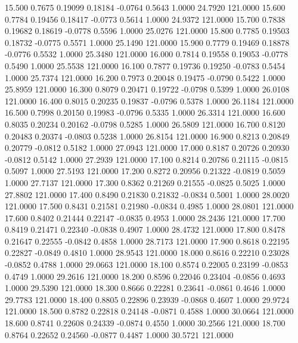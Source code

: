  15.500   0.7675   0.19099   0.18184  -0.0764   0.5643   1.0000  24.7920 121.0000
  15.600   0.7784   0.19456   0.18417  -0.0773   0.5614   1.0000  24.9372 121.0000
  15.700   0.7838   0.19682   0.18619  -0.0778   0.5596   1.0000  25.0276 121.0000
  15.800   0.7785   0.19503   0.18732  -0.0775   0.5571   1.0000  25.1490 121.0000
  15.900   0.7779   0.19469   0.18878  -0.0776   0.5532   1.0000  25.3480 121.0000
  16.000   0.7814   0.19558   0.19053  -0.0778   0.5490   1.0000  25.5538 121.0000
  16.100   0.7877   0.19736   0.19250  -0.0783   0.5454   1.0000  25.7374 121.0000
  16.200   0.7973   0.20048   0.19475  -0.0790   0.5422   1.0000  25.8959 121.0000
  16.300   0.8079   0.20471   0.19722  -0.0798   0.5399   1.0000  26.0108 121.0000
  16.400   0.8015   0.20235   0.19837  -0.0796   0.5378   1.0000  26.1184 121.0000
  16.500   0.7998   0.20150   0.19983  -0.0796   0.5335   1.0000  26.3314 121.0000
  16.600   0.8035   0.20234   0.20162  -0.0798   0.5285   1.0000  26.5809 121.0000
  16.700   0.8120   0.20483   0.20374  -0.0803   0.5238   1.0000  26.8154 121.0000
  16.900   0.8213   0.20849   0.20779  -0.0812   0.5182   1.0000  27.0943 121.0000
  17.000   0.8187   0.20726   0.20930  -0.0812   0.5142   1.0000  27.2939 121.0000
  17.100   0.8214   0.20786   0.21115  -0.0815   0.5097   1.0000  27.5193 121.0000
  17.200   0.8272   0.20956   0.21322  -0.0819   0.5059   1.0000  27.7137 121.0000
  17.300   0.8362   0.21269   0.21555  -0.0825   0.5025   1.0000  27.8802 121.0000
  17.400   0.8490   0.21830   0.21832  -0.0834   0.5001   1.0000  28.0020 121.0000
  17.500   0.8431   0.21581   0.21980  -0.0834   0.4985   1.0000  28.0801 121.0000
  17.600   0.8402   0.21444   0.22147  -0.0835   0.4953   1.0000  28.2436 121.0000
  17.700   0.8419   0.21471   0.22340  -0.0838   0.4907   1.0000  28.4732 121.0000
  17.800   0.8478   0.21647   0.22555  -0.0842   0.4858   1.0000  28.7173 121.0000
  17.900   0.8618   0.22195   0.22827  -0.0849   0.4810   1.0000  28.9543 121.0000
  18.000   0.8616   0.22210   0.23028  -0.0852   0.4788   1.0000  29.0663 121.0000
  18.100   0.8574   0.22005   0.23199  -0.0853   0.4749   1.0000  29.2616 121.0000
  18.200   0.8596   0.22046   0.23404  -0.0856   0.4693   1.0000  29.5390 121.0000
  18.300   0.8666   0.22281   0.23641  -0.0861   0.4646   1.0000  29.7783 121.0000
  18.400   0.8805   0.22896   0.23939  -0.0868   0.4607   1.0000  29.9724 121.0000
  18.500   0.8782   0.22818   0.24148  -0.0871   0.4588   1.0000  30.0664 121.0000
  18.600   0.8741   0.22608   0.24339  -0.0874   0.4550   1.0000  30.2566 121.0000
  18.700   0.8764   0.22652   0.24560  -0.0877   0.4487   1.0000  30.5721 121.0000
